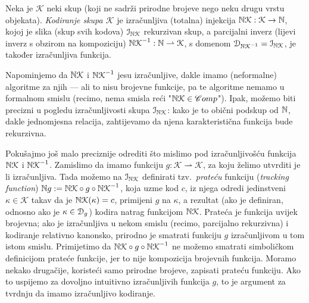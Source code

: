 \begin{definicija}[{name=[kodiranje]}]
Neka je $\mathcal K$ neki skup (koji ne sadrži prirodne brojeve nego neku drugu vrstu objekata). \emph{Kodiranje skupa $\mathcal K$} je izračunljiva (totalna) injekcija ${\mathbb N}\mathcal K:\mathcal K\to{\mathbb N}$, kojoj je slika (skup svih kodova) $\mathcal I_{{\mathbb N}\mathcal K}$ rekurzivan skup, a parcijalni inverz (lijevi inverz s obzirom na kompoziciju) ${{\mathbb N}\mathcal K}^{-1}:{\mathbb N}\rightharpoonup\mathcal K$, s domenom $\mathcal D_{{{\mathbb N}\mathcal K}^{-1}}=\mathcal I_{{\mathbb N}\mathcal K}$, je također izračunljiva funkcija.
\end{definicija}

Napominjemo da ${{\mathbb N}\mathcal K}$ i ${{\mathbb N}\mathcal K}^{-1}$ jesu izračunljive, dakle imamo (neformalne) algoritme za njih --- ali to nisu brojevne funkcije, pa te algoritme nemamo u formalnom smislu (recimo, nema smisla reći "${\mathbb N}\mathcal K\in\mathscr Comp$"). Ipak, možemo biti precizni u pogledu izračunljivosti skupa $\mathcal I_{{\mathbb N}\mathcal K}$: kako je to obični podskup od ${\mathbb N}$, dakle jednomjesna relacija, zahtijevamo da njena karakteristična funkcija bude rekurzivna.

Pokušajmo još malo preciznije odrediti što mislimo pod izračunljivošću funkcija ${{\mathbb N}\mathcal K}$ i ${{\mathbb N}\mathcal K}^{-1}$. Zamislimo da imamo funkciju $g:\mathcal K\rightharpoonup\mathcal K$, za koju želimo utvrditi je li izračunljiva. Tada možemo na $\mathcal I_{{\mathbb N}\mathcal K}$ definirati tzv.\ \emph{prateću} funkciju (\emph{tracking function}) ${\mathbb N} g:={{\mathbb N}\mathcal K}\circ g\circ{{\mathbb N}\mathcal K}^{-1}$, koja uzme kod $c$, iz njega odredi jedinstveni $\kappa\in\mathcal K$ takav da je ${{\mathbb N}\mathcal K}(\kappa)=c$, primijeni $g$ na $\kappa$, a rezultat (ako je definiran, odnosno ako je $\kappa\in\mathcal D_{g}$) kodira natrag funkcijom ${{\mathbb N}\mathcal K}$. Prateća je funkcija uvijek brojevna; ako je izračunljiva u nekom smislu (recimo, parcijalno rekurzivna) i kodiranje relativno kanonsko, prirodno je smatrati funkciju $g$ izračunljivom u tom istom smislu. Primijetimo da ${{\mathbb N}\mathcal K}\circ g\circ{{\mathbb N}\mathcal K}^{-1}$ ne možemo smatrati simboličkom definicijom prateće funkcije, jer to nije kompozicija brojevnih funkcija. Moramo nekako drugačije, koristeći samo prirodne brojeve, zapisati prateću funkciju. Ako to uspijemo za dovoljno intuitivno izračunljivih funkcija $g$, to je argument za tvrdnju da imamo izračunljivo kodiranje.

